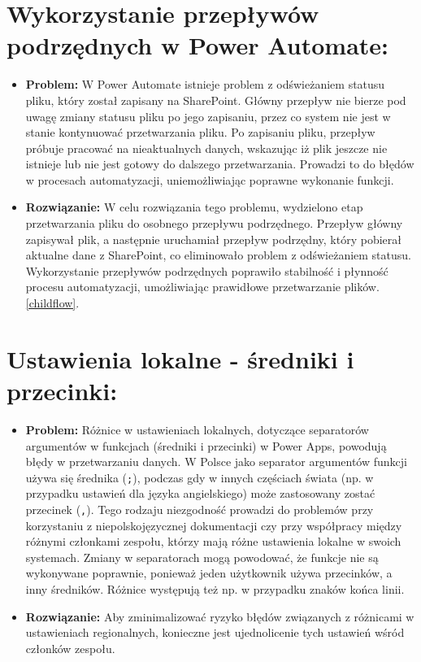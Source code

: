             \section*{Wykorzystanie przepływów podrzędnych w Power Automate:}
            \begin{itemize}
                  \item \textbf{Problem:} W Power Automate istnieje problem z odświeżaniem statusu pliku, który został zapisany na SharePoint. Główny przepływ nie bierze pod uwagę zmiany statusu pliku po jego zapisaniu, przez co system nie jest w stanie kontynuować przetwarzania pliku. Po zapisaniu pliku, przepływ próbuje pracować na nieaktualnych danych, wskazując iż plik jeszcze nie istnieje lub nie jest gotowy do dalszego przetwarzania. Prowadzi to do błędów w procesach automatyzacji, uniemożliwiając poprawne wykonanie funkcji.
                  \item \textbf{Rozwiązanie:} W celu rozwiązania tego problemu, wydzielono etap przetwarzania pliku do osobnego przepływu podrzędnego. Przepływ główny zapisywał plik, a następnie uruchamiał przepływ podrzędny, który pobierał aktualne dane z SharePoint, co eliminowało problem z odświeżaniem statusu. Wykorzystanie przepływów podrzędnych poprawiło stabilność i płynność procesu automatyzacji, umożliwiając prawidłowe przetwarzanie plików. \ref{childflow}.
            \end{itemize}


            \section*{Ustawienia lokalne - średniki i przecinki:}
            \begin{itemize}
                  \item \textbf{Problem:} Różnice w ustawieniach lokalnych, dotyczące separatorów argumentów w funkcjach (średniki i przecinki) w Power Apps, powodują błędy w przetwarzaniu danych. W Polsce jako separator argumentów funkcji używa się średnika (\texttt{;}), podczas gdy w innych częściach świata (np. w przypadku ustawień dla języka angielskiego) może zastosowany zostać przecinek (\texttt{,}). Tego rodzaju niezgodność prowadzi do problemów przy korzystaniu z niepolskojęzycznej dokumentacji czy przy współpracy między różnymi członkami zespołu, którzy mają różne ustawienia lokalne w swoich systemach. Zmiany w separatorach mogą powodować, że funkcje nie są wykonywane poprawnie, ponieważ jeden użytkownik używa przecinków, a inny średników. Różnice występują też np. w przypadku znaków końca linii.
                  \item \textbf{Rozwiązanie:} Aby zminimalizować ryzyko błędów związanych z różnicami w ustawieniach regionalnych, konieczne jest ujednolicenie tych ustawień wśród członków zespołu.
            \end{itemize}


